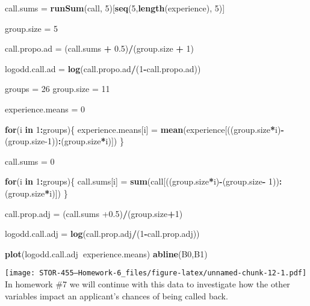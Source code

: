\documentclass[
]{article}
\newenvironment{Shaded}{\begin{snugshade}}{\end{snugshade}}
\newcommand{\ControlFlowTok}[1]{\textcolor[rgb]{0.13,0.29,0.53}{\textbf{#1}}}
\newcommand{\DecValTok}[1]{\textcolor[rgb]{0.00,0.00,0.81}{#1}}
\newcommand{\FloatTok}[1]{\textcolor[rgb]{0.00,0.00,0.81}{#1}}
\newcommand{\KeywordTok}[1]{\textcolor[rgb]{0.13,0.29,0.53}{\textbf{#1}}}
\newcommand{\NormalTok}[1]{#1}
\newcommand{\OperatorTok}[1]{\textcolor[rgb]{0.81,0.36,0.00}{\textbf{#1}}}
\newcommand{\StringTok}[1]{\textcolor[rgb]{0.31,0.60,0.02}{#1}}
\begin{document}
\begin{Shaded}
\begin{Highlighting}[]
\NormalTok{call.sums =}\StringTok{ }\KeywordTok{runSum}\NormalTok{(call, }\DecValTok{5}\NormalTok{)[}\KeywordTok{seq}\NormalTok{(}\DecValTok{5}\NormalTok{,}\KeywordTok{length}\NormalTok{(experience), }\DecValTok{5}\NormalTok{)]}

\NormalTok{group.size =}\StringTok{ }\DecValTok{5}

\NormalTok{call.propo.ad =}\StringTok{ }\NormalTok{(call.sums }\OperatorTok{+}\StringTok{ }\FloatTok{0.5}\NormalTok{)}\OperatorTok{/}\NormalTok{(group.size }\OperatorTok{+}\StringTok{ }\DecValTok{1}\NormalTok{)}

\NormalTok{logodd.call.ad =}\StringTok{ }\KeywordTok{log}\NormalTok{(call.propo.ad}\OperatorTok{/}\NormalTok{(}\DecValTok{1}\OperatorTok{-}\NormalTok{call.propo.ad))}
\end{Highlighting}
\end{Shaded}

\begin{Shaded}
\begin{Highlighting}[]
\NormalTok{groups =}\StringTok{ }\DecValTok{26}
\NormalTok{group.size =}\StringTok{ }\DecValTok{11}

\NormalTok{experience.means =}\StringTok{ }\DecValTok{0}

\ControlFlowTok{for}\NormalTok{(i }\ControlFlowTok{in} \DecValTok{1}\OperatorTok{:}\NormalTok{groups)\{}
\NormalTok{  experience.means[i] =}\StringTok{ }\KeywordTok{mean}\NormalTok{(experience[((group.size}\OperatorTok{*}\NormalTok{i)}\OperatorTok{-}\NormalTok{(group.size}\DecValTok{-1}\NormalTok{))}\OperatorTok{:}\NormalTok{(group.size}\OperatorTok{*}\NormalTok{i)])}
\NormalTok{\}}

\NormalTok{call.sums =}\StringTok{ }\DecValTok{0}

\ControlFlowTok{for}\NormalTok{(i }\ControlFlowTok{in} \DecValTok{1}\OperatorTok{:}\NormalTok{groups)\{}
\NormalTok{  call.sums[i] =}\StringTok{ }\KeywordTok{sum}\NormalTok{(call[((group.size}\OperatorTok{*}\NormalTok{i)}\OperatorTok{-}\NormalTok{(group.size}\OperatorTok{-}\StringTok{ }\DecValTok{1}\NormalTok{))}\OperatorTok{:}\NormalTok{(group.size}\OperatorTok{*}\NormalTok{i)])}
\NormalTok{  \}}


\NormalTok{call.prop.adj =}\StringTok{ }\NormalTok{(call.sums }\FloatTok{+0.5}\NormalTok{)}\OperatorTok{/}\NormalTok{(group.size}\OperatorTok{+}\DecValTok{1}\NormalTok{)}

\NormalTok{logodd.call.adj =}\StringTok{ }\KeywordTok{log}\NormalTok{(call.prop.adj}\OperatorTok{/}\NormalTok{(}\DecValTok{1}\OperatorTok{-}\NormalTok{call.prop.adj))}

\KeywordTok{plot}\NormalTok{(logodd.call.adj}\OperatorTok{~}\NormalTok{experience.means)}
\KeywordTok{abline}\NormalTok{(B0,B1)}
\end{Highlighting}
\end{Shaded}

\texttt{[image: STOR-455---Homework-6\_files/figure-latex/unnamed-chunk-12-1.pdf]}
In homework \#7 we will continue with this data to investigate how the
other variables impact an applicant's chances of being called back.
\end{document}
